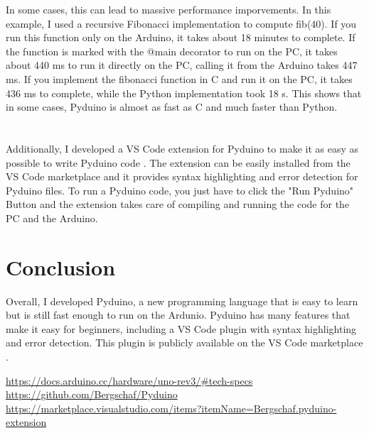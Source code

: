 \documentclass{article}
\begin{document}
\begin{multicols}{2}
In some cases, this can lead to massive performance imporvements. In this example, I used a recursive Fibonacci implementation to compute fib(40). If you run this function only on the Arduino, it takes about 18 minutes to complete. If the function is marked with the @main decorator to run on the PC, it takes about 440 ms to run it directly on the PC, calling it from the Arduino takes 447 ms. If you implement the fibonacci function in C and run it on the PC, it takes 436 ms to complete, while the Python implementation took 18 s. This shows that in some cases, Pyduino is almost as fast as C and much faster than Python. \\
\\\\
Additionally, I developed a VS Code extension for Pyduino to make it as easy as possible to write Pyduino code \cite{Q3}. The extension can be easily installed from the VS Code marketplace and it provides syntax highlighting and error detection for Pyduino files. To run a Pyduino code, you just have to click the "Run Pyduino" Button and the extension takes care of compiling and running the code for the PC and the Arduino.
\section{Conclusion}
\noindent Overall, I developed Pyduino, a new programming language that is easy to learn but is still fast enough to run on the Ardunio. Pyduino has many features that make it easy for beginners, including a VS Code plugin with syntax highlighting and error detection. This plugin is publicly available on the VS Code marketplace \cite{Q3}.


\begin{thebibliography}{99}
\url{https://docs.arduino.cc/hardware/uno-rev3/#tech-specs}
\url{https://github.com/Bergschaf/Pyduino}
\url{https://marketplace.visualstudio.com/items?itemName=Bergschaf.pyduino-extension}
\end{thebibliography}
\end{multicols}
\end{document}
